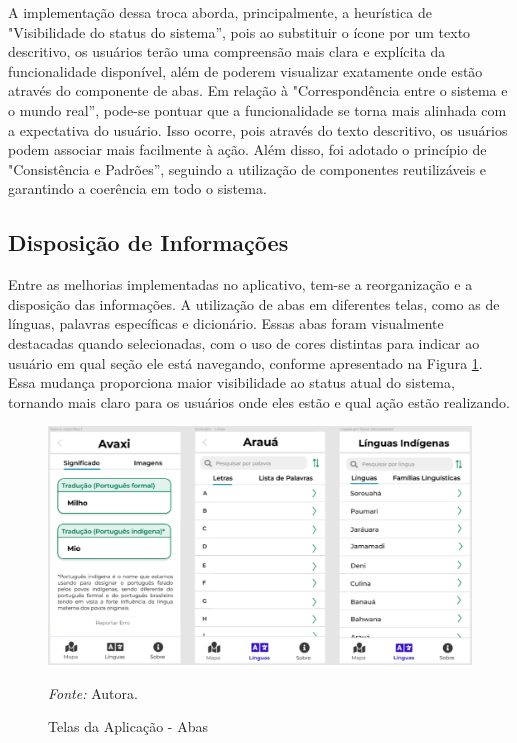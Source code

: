 A implementação dessa troca aborda, principalmente, a heurística de "Visibilidade do status do sistema'', pois ao substituir o ícone por um texto descritivo, os usuários terão uma compreensão mais clara e explícita da 
funcionalidade disponível, além de poderem visualizar exatamente onde estão através do componente de abas. Em relação à "Correspondência entre o sistema e o mundo real'', pode-se pontuar que a funcionalidade se torna mais 
alinhada com a expectativa do usuário. Isso ocorre, pois através do texto descritivo, os usuários podem associar mais facilmente à ação. Além disso, foi adotado o princípio de "Consistência e Padrões'', seguindo a utilização de componentes 
reutilizáveis e garantindo a coerência em todo o sistema. 

\subsection{Disposição de Informações}
\label{sec:Disposicao de Informacoes}

Entre as melhorias implementadas no aplicativo, tem-se a reorganização e a disposição das informações. A utilização de abas em diferentes telas, como as de línguas, palavras específicas e dicionário. Essas abas foram 
visualmente destacadas quando selecionadas, com o uso de cores distintas para indicar ao usuário em qual seção ele está navegando, conforme apresentado na Figura \ref{fig25}. Essa mudança proporciona maior visibilidade ao status atual do sistema, tornando mais 
claro para os usuários onde eles estão e qual ação estão realizando.

\newpage

\begin{figure}[h!]
	\centering
	\caption{Telas da Aplicação - Abas}
	\begin{adjustbox}{center}
		\includegraphics[width=1\textwidth]{figuras/abas.eps}
	\end{adjustbox}
	\begin{tablenotes}[flushleft]
		\centering
		\item \textit{Fonte:} Autora.
	\end{tablenotes}
	\label{fig25}
\end{figure}

